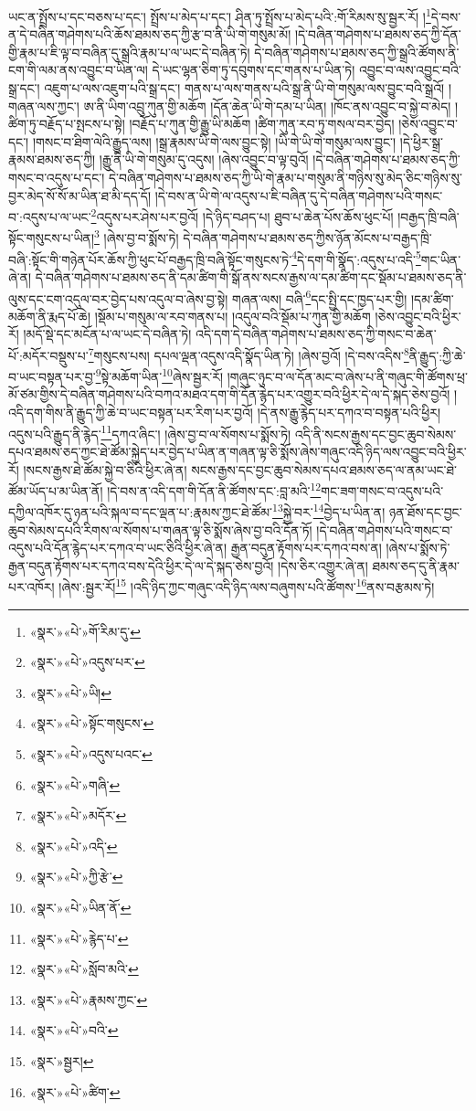ཡང་ན་སྤྲོས་པ་དང་བཅས་པ་དང་། སྤྲོས་པ་མེད་པ་དང་། ཤིན་ཏུ་སྤྲོས་པ་མེད་པའི་:གོ་རིམས་སུ་སྦྱར་རོ། །\footnote{«སྣར་»«པེ་»གོ་རིམ་དུ་}དེ་བས་ན་དེ་བཞིན་གཤེགས་པའི་ཆོས་ཐམས་ཅད་ཀྱི་རྩ་བ་ནི་ཡི་གེ་གསུམ་མོ། །དེ་བཞིན་གཤེགས་པ་ཐམས་ཅད་ཀྱི་དོན་གྱི་རྣམ་པ་ཇི་ལྟ་བ་བཞིན་དུ་སྒྲའི་རྣམ་པ་ལ་ཡང་དེ་བཞིན་ཏེ། དེ་བཞིན་གཤེགས་པ་ཐམས་ཅད་ཀྱི་སྒྲའི་ཚོགས་ནི་ངག་གི་ལམ་ནས་འབྱུང་བ་ཡིན་ལ། དེ་ཡང་ལྷན་ཅིག་ཏུ་དབུགས་དང་གནས་པ་ཡིན་ཏེ། འབྱུང་བ་ལས་འབྱུང་བའི་སྒྲ་དང་། འཇུག་པ་ལས་འཇུག་པའི་སྒྲ་དང་། གནས་པ་ལས་གནས་པའི་སྒྲ་ནི་ཡི་གེ་གསུམ་ལས་བྱུང་བའི་སྒྲའོ། །གཞན་ལས་ཀྱང་། ཨ་ནི་ཡིག་འབྲུ་ཀུན་གྱི་མཆོག །དོན་ཆེན་ཡི་གེ་དམ་པ་ཡིན། །ཁོང་ནས་འབྱུང་བ་སྐྱེ་བ་མེད། །ཚིག་ཏུ་བརྗོད་པ་སྤངས་པ་སྟེ། །བརྗོད་པ་ཀུན་གྱི་རྒྱུ་ཡི་མཆོག །ཚིག་ཀུན་རབ་ཏུ་གསལ་བར་བྱེད། །ཅེས་འབྱུང་བ་དང་། །གསང་བ་ཐིག་ལེའི་རྒྱུད་ལས། །སྒྲ་རྣམས་ཡི་གེ་ལས་བྱུང་སྟེ། །ཡི་གེ་ཡི་གེ་གསུམ་ལས་བྱུང་། །དེ་ཕྱིར་སྒྲ་རྣམས་ཐམས་ཅད་ཀྱི། །རྒྱུ་ནི་ཡི་གེ་གསུམ་དུ་འདུས། །ཞེས་འབྱུང་བ་ལྟ་བུའོ། །དེ་བཞིན་གཤེགས་པ་ཐམས་ཅད་ཀྱི་གསང་བ་འདུས་པ་དང་། དེ་བཞིན་གཤེགས་པ་ཐམས་ཅད་ཀྱི་ཡི་གེ་རྣམ་པ་གསུམ་ནི་གཉིས་སུ་མེད་ཅིང་གཉིས་སུ་བྱར་མེད་སོ་སོ་མ་ཡིན་ཐ་མི་དད་དོ། །དེ་བས་ན་ཡི་གེ་ལ་འདུས་པ་ཇི་བཞིན་དུ་དེ་བཞིན་གཤེགས་པའི་གསང་བ་:འདུས་པ་ལ་ཡང་\footnote{«སྣར་»«པེ་»འདུས་པར་}འདུས་པར་ཤེས་པར་བྱའོ། །དེ་ཉིད་བཤད་པ། ཐུབ་པ་ཆེན་པོས་ཆོས་ཕུང་པོ། །བརྒྱད་ཁྲི་བཞི་སྟོང་གསུངས་པ་ཡིན།\footnote{«སྣར་»«པེ་»ཡི།} །ཞེས་བྱ་བ་སྨོས་ཏེ། དེ་བཞིན་གཤེགས་པ་ཐམས་ཅད་ཀྱིས་ཉོན་མོངས་པ་བརྒྱད་ཁྲི་བཞི་:སྟོང་གི་གཉེན་པོར་ཆོས་ཀྱི་ཕུང་པོ་བརྒྱད་ཁྲི་བཞི་སྟོང་གསུངས་ཏེ་\footnote{«སྣར་»«པེ་»སྟོང་གསུངས་}དེ་དག་གི་སྣོད་:འདུས་པ་འདི་\footnote{«སྣར་»«པེ་»འདུས་པའང་}གང་ཡིན་ཞེ་ན། དེ་བཞིན་གཤེགས་པ་ཐམས་ཅད་ནི་དམ་ཚིག་གི་སྒོ་ནས་སངས་རྒྱས་ལ་དམ་ཚིག་དང་སྡོམ་པ་ཐམས་ཅད་ནི་ལུས་དང་ངག་འདུལ་བར་བྱེད་པས་འདུལ་བ་ཞེས་བྱ་སྟེ། གཞན་ལས། བཞི་\footnote{«སྣར་»«པེ་»གཞི་}དང་སྤྱི་དང་ཁྱད་པར་གྱི། །དམ་ཚིག་མཆོག་ནི་རྨད་པོ་ཆེ། །སྡོམ་པ་གསུམ་ལ་རབ་གནས་པ། །འདུལ་བའི་སྡོམ་པ་ཀུན་གྱི་མཆོག །ཅེས་འབྱུང་བའི་ཕྱིར་རོ། །མདོ་སྡེ་དང་མངོན་པ་ལ་ཡང་དེ་བཞིན་ཏེ། འདི་དག་དེ་བཞིན་གཤེགས་པ་ཐམས་ཅད་ཀྱི་གསང་བ་ཆེན་པོ་:མདོར་བསྡུས་པ་\footnote{«སྣར་»«པེ་»མདོར་}གསུངས་པས། དཔལ་ལྡན་འདུས་འདི་སྣོད་ཡིན་ཏེ། །ཞེས་བྱའོ། །དེ་བས་འདིས་\footnote{«སྣར་»«པེ་»འདི་}ནི་རྒྱུད་:ཀྱི་ཆེ་བ་ཡང་བསྟན་པར་བྱ་\footnote{«སྣར་»«པེ་»ཀྱི་རྩེ་}སྟེ་མཆོག་ཡིན་\footnote{«སྣར་»«པེ་»ཡིན་ནོ་}ཞེས་སྦྱར་རོ། །གཞུང་ཉུང་བ་ལ་དོན་མང་བ་ཞེས་པ་ནི་གཞུང་གི་ཚོགས་ཕྲ་མོ་ཙམ་གྱིས་དེ་བཞིན་གཤེགས་པའི་བཀའ་མཐའ་དག་གི་དོན་རྙེད་པར་འགྱུར་བའི་ཕྱིར་དེ་ལ་དེ་སྐད་ཅེས་བྱའོ། །འདི་དག་གིས་ནི་རྒྱུད་ཀྱི་ཆེ་བ་ཡང་བསྟན་པར་རིག་པར་བྱའོ། །དེ་ནས་རྒྱུ་རྙེད་པར་དཀའ་བ་བསྟན་པའི་ཕྱིར། འདུས་པའི་རྒྱུད་ནི་རྙེད་\footnote{«སྣར་»«པེ་»རྙེད་པ་}དཀའ་ཞིང་། །ཞེས་བྱ་བ་ལ་སོགས་པ་སྨོས་ཏེ། འདི་ནི་སངས་རྒྱས་དང་བྱང་ཆུབ་སེམས་དཔའ་ཐམས་ཅད་ཀྱང་ཐེ་ཚོམ་སྐྱེད་པར་བྱེད་པ་ཡིན་ན་གཞན་ལྟ་ཅི་སྨོས་ཞེས་གཞུང་འདི་ཉིད་ལས་འབྱུང་བའི་ཕྱིར་རོ། །སངས་རྒྱས་ཐེ་ཚོམ་སྐྱེ་བ་ཅིའི་ཕྱིར་ཞེ་ན། སངས་རྒྱས་དང་བྱང་ཆུབ་སེམས་དཔའ་ཐམས་ཅད་ལ་ནམ་ཡང་ཐེ་ཚོམ་ཡོད་པ་མ་ཡིན་ནོ། །དེ་བས་ན་འདི་དག་གི་དོན་ནི་ཚོགས་དང་:བླ་མའི་\footnote{«སྣར་»«པེ་»སློབ་མའི་}གང་ཟག་གསང་བ་འདུས་པའི་དཀྱིལ་འཁོར་དུ་ཉན་པའི་སྐལ་བ་དང་ལྡན་པ་:རྣམས་ཀྱང་ཐེ་ཚོམ་\footnote{«སྣར་»«པེ་»རྣམས་ཀྱང་}སྐྱེ་བར་\footnote{«སྣར་»«པེ་»བའི་}བྱེད་པ་ཡིན་ན། ཉན་ཐོས་དང་བྱང་ཆུབ་སེམས་དཔའི་རིགས་ལ་སོགས་པ་གཞན་ལྟ་ཅི་སྨོས་ཞེས་བྱ་བའི་དོན་ཏོ། །དེ་བཞིན་གཤེགས་པའི་གསང་བ་འདུས་པའི་དོན་རྙེད་པར་དཀའ་བ་ཡང་ཅིའི་ཕྱིར་ཞེ་ན། རྒྱན་བདུན་རྟོགས་པར་དཀའ་བས་ན། །ཞེས་པ་སྨོས་ཏེ་རྒྱན་བདུན་རྟོགས་པར་དཀའ་བས་དེའི་ཕྱིར་དེ་ལ་དེ་སྐད་ཅེས་བྱའོ། །དེས་ཅིར་འགྱུར་ཞེ་ན། ཐམས་ཅད་དུ་ནི་རྣམ་པར་འཁོར། །ཞེས་:སྦྱར་རོ།\footnote{«སྣར་»སྦྱར།} །འདི་ཉིད་ཀྱང་གཞུང་འདི་ཉིད་ལས་བཞུགས་པའི་ཚོགས་\footnote{«སྣར་»«པེ་»ཚིག་}ནས་བརྩམས་ཏེ། 